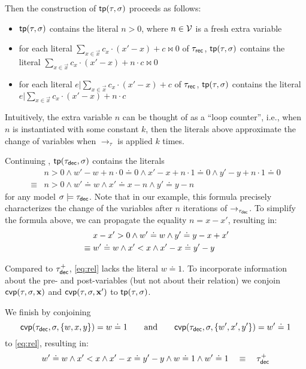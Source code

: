 %
Then the construction of $\mathsf{tp}(\tau,\sigma)$ proceeds as follows:
%
\begin{itemize}
  \item $\mathsf{tp}(\tau,\sigma)$ contains the literal $n > 0$, where $n \in \mathcal{V}$ is a fresh extra variable
  \item for each literal $\sum_{x \in \vec{x}} c_x \cdot (x'-x) + c \bowtie 0$ of $\tau_{\mathsf{rec}}$, $\mathsf{tp}(\tau,\sigma)$ contains the literal $\sum_{x \in \vec{x}} c_x \cdot (x'-x) + n \cdot c \bowtie 0$
  \item for each literal $e|\sum_{x \in \vec{x}} c_x \cdot (x'-x) + c$ of $\tau_{\mathsf{rec}}$, $\mathsf{tp}(\tau,\sigma)$ contains the literal $e|\sum_{x \in \vec{x}} c_x \cdot (x'-x) + n \cdot c$
\end{itemize}
%
Intuitively, the extra variable $n$ can be thought of as a ``loop counter'', i.e., when
$n$ is instantiated with some constant $k$, then the literals above approximate the change
of variables when $\to_\tau$ is applied $k$ times.

\begin{example}
  \label{ex:tip1}
  Continuing , $\mathsf{tp}(\tau_{\mathsf{dec}},\sigma)$ contains the literals
  \begin{align*}
    {}           & n > 0 \land w' - w + n \cdot 0 \doteq 0 \land x' - x + n \cdot 1 \doteq 0 \land y' - y + n \cdot 1 \doteq 0 \\
    {} \equiv {} & n > 0 \land w' \doteq w \land x' \doteq x - n \land y' \doteq y - n
  \end{align*}
  for any model $\sigma \models \tau_{\mathsf{dec}}$.
  Note that in our example, this formula precisely characterizes the change of the variables after $n$ iterations of $\to_{\tau_{\mathsf{dec}}}$.
  To simplify the formula above, we can propagate the equality $n = x - x'$, resulting in:
  \begin{align}
    & x - x' > 0 \land w' \doteq w \land y' \doteq y - x + x' \notag \\
    {} \equiv {} & w' \doteq w \land x' < x \land x' - x \doteq y' - y \label{eq:rel}
  \end{align}
\end{example}
%
Compared to $\tau_{\mathsf{dec}}^+$, \eqref{eq:rel} lacks the literal $w \doteq 1$.
%
To incorporate information about the pre- and post-variables (but not about their relation) we conjoin $\mathsf{cvp}(\tau,\sigma,\bm{\mathrm{x}})$ and $\mathsf{cvp}(\tau,\sigma,\bm{\mathrm{x}}')$ to $\mathsf{tp}(\tau,\sigma)$.

\begin{example}
  We finish  by conjoining
  \[
    \mathsf{cvp}(\tau_{\mathsf{dec}},\sigma,\{w,x,y\}) = w \doteq 1 \qquad \text{and} \qquad \mathsf{cvp}(\tau_{\mathsf{dec}},\sigma,\{w',x',y'\}) = w' \doteq 1
  \]
  to \eqref{eq:rel}, resulting in:
  \[
    w' \doteq w \land x' < x \land x' - x \doteq y' - y \land w \doteq 1 \land w' \doteq 1 \quad \equiv \quad \tau_{\mathsf{dec}}^+
  \]
\end{example}

